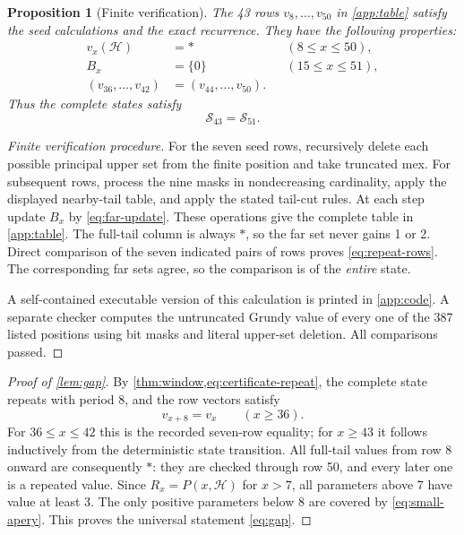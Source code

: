 \documentclass[11pt,letterpaper]{article}
\numberwithin{equation}{section}
\newtheorem{proposition}[theorem]{Proposition}
\theoremstyle{definition}
\theoremstyle{remark}
\newcommand{\sat}{\ast}
\newcommand{\HH}{\mathcal H}
\begin{document}
\begin{proposition}[Finite verification]\label{prop:certificate}
The 43 rows $v_8,\ldots,v_{50}$ in \cref{app:table} satisfy the
seed calculations and the exact recurrence. They have the following
properties:
\begin{align}
 v_x(\HH)&=\sat &&(8\leq x\leq50),\label{eq:full-column}\\
 B_x&=\{0\} &&(15\leq x\leq51),\label{eq:far-constant}\\
 (v_{36},\ldots,v_{42})&=(v_{44},\ldots,v_{50}).
 \label{eq:repeat-rows}
\end{align}
Thus the complete states satisfy
\begin{equation}\label{eq:certificate-repeat}
 \boxed{\mathscr S_{43}=\mathscr S_{51}.}
\end{equation}
\end{proposition}
\begin{proof}[Finite verification procedure]
For the seven seed rows, recursively delete each possible principal
upper set from the finite position and take truncated mex. For
subsequent rows, process the nine masks in nondecreasing cardinality,
apply the displayed nearby-tail table, and apply the stated tail-cut
rules. At each step update $B_x$ by \cref{eq:far-update}.
These operations give the complete table in \cref{app:table}.
The full-tail column is always $\sat$, so the far set never gains
1 or 2. Direct comparison of the seven indicated pairs of rows
proves \cref{eq:repeat-rows}. The corresponding far sets agree,
so the comparison is of the \emph{entire} state.

A self-contained executable version of this calculation is printed
in \cref{app:code}. A separate checker computes the untruncated
Grundy value of every one of the 387 listed positions using bit
masks and literal upper-set deletion. All comparisons passed.
\end{proof}

\begin{proof}[Proof of \cref{lem:gap}]
By \cref{thm:window,eq:certificate-repeat}, the complete state
repeats with period 8, and the row vectors satisfy
\[
 v_{x+8}=v_x\qquad(x\geq36).
\]
For $36\leq x\leq42$ this is the recorded seven-row equality;
for $x\geq43$ it follows inductively from the deterministic state
transition. All full-tail values from row 8 onward are consequently
$\sat$: they are checked through row 50, and every later one is
a repeated value. Since $R_x=P(x,\HH)$ for $x>7$, all parameters
above 7 have value at least 3. The only positive parameters below
8 are covered by \cref{eq:small-apery}. This proves the universal
statement \cref{eq:gap}.
\end{proof}
\end{document}
